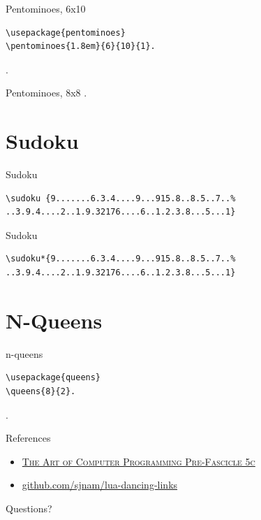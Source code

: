 \documentclass[xcolor=svgnames]{beamer}
\begin{document}
%
\begin{frame}[fragile]{Pentominoes, 6x10}
\begin{verbatim}
\usepackage{pentominoes}
\pentominoes{1.8em}{6}{10}{1}.
\end{verbatim}  

.

\end{frame}

%
\begin{frame}{Pentominoes, 8x8}
.
\end{frame}


\section{Sudoku}

%
\begin{frame}[fragile]{Sudoku}
\begin{verbatim}
\sudoku {9.......6.3.4....9...915.8..8.5..7..%
..3.9.4....2..1.9.32176....6..1.2.3.8...5...1}
\end{verbatim}  
\begin{center}
\end{center}
\end{frame}

%
\begin{frame}[fragile]{Sudoku}
\begin{verbatim}
\sudoku*{9.......6.3.4....9...915.8..8.5..7..%
..3.9.4....2..1.9.32176....6..1.2.3.8...5...1}
\end{verbatim}
\begin{center}
\end{center}
\end{frame}


\section{N-Queens}

%
\begin{frame}[fragile]{n-queens}
\begin{verbatim}
\usepackage{queens}
\queens{8}{2}.
\end{verbatim}
\vspace{-10mm}
.
\end{frame}


%
\begin{frame}{References}
  \begin{itemize}
  \item \href{http://www-cs-faculty.stanford.edu/~knuth/fasc5c.ps.gz}
    {\textsc{The Art of Computer Programming Pre-Fascicle 5c}}
  \item \href{https://github.com/sjnam/lua-dancing-links}
    {github.com/sjnam/lua-dancing-links}
  \end{itemize}
\end{frame}

%
\begin{frame}[standout]
  Questions?
\end{frame}
\end{document}

